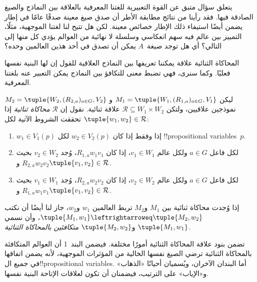 \documentclass[../../../include/open-logic-section]{subfiles}
\begin{document}


يتعلق سؤال متبق عن القوة التعبيرية للغتنا المعرفية بالعلاقة بين
النماذج والصيغ الصادقة فيها. فقد رأينا من نتائج مطابقة الأطر أن صدق
صيغ معينة صدقًا عامًا في إطار يضمن أيضًا استيفاء ذلك الإطار خصائص
معينة. لكن هل تتيح لنا لغتنا الموجهية، مثلًا، التمييز بين عالم فيه سهم
انعكاسي وسلسلة لا نهائية من العوالم يؤدي كل منها إلى التالي؟ أي هل
توجد صيغة~$A$ يمكن أن تصدق في أحد هذين العالمين وحده؟

المحاكاة الثنائية علاقة يمكننا تعريفها بين النماذج العلاقية للقول إن
لها البنية نفسها فعليًا. وكما سنرى، فهي تضبط معنى للتكافؤ بين النماذج
يمكن التعبير عنه بلغتنا المعرفية.

\begin{defn}
ليكن $M_1 = \tuple{W_1,(R_{1,a})_{a \in G},V_1}$ و
$M_2 = \tuple{W_2,(R_{2,a})_{a \in G},V_2}$ نموذجين علاقيين، ولتكن
$\mathcal{R} \subseteq W_1 \times W_2$ علاقة ثنائية. نقول إن
$\mathcal{R}$ \emph{محاكاة ثنائية} إذا تحققت الشروط الآتية لكل
$\tuple{w_1, w_2} \in \mathcal{R}$:

\begin{enumerate}
  \item $w_1 \in V_1(p)$ إذا وفقط إذا كان $w_2 \in V_2(p)$ لكل
  !!{propositional variable}s~$p$.
  \item لكل فاعل $a \in G$ ولكل عالم $v_1 \in W_1$، إذا كان
  $R_{1,a} w_1 v_1$، وُجد $v_2 \in W_2$ بحيث
  $R_{2,a} w_2 v_2$ و$\tuple{v_1, v_2} \in
  \mathcal{R}$.
  \item لكل فاعل $a \in G$ ولكل عالم $v_2 \in W_2$، إذا كان
   $R_{2,a} w_2 v_2$، وُجد $v_1 \in W_1$ بحيث
   $R_{1,a} w_1 v_1$ و$\tuple{v_1, v_2} \in
   \mathcal{R}$.
\end{enumerate}

إذا وُجدت محاكاة ثنائية بين $M_1$ و$M_2$ تربط العالمين $w_1$
و$w_2$، جاز لنا أيضًا أن نكتب
$\tuple{M_1, w_1} \leftrightarroweq \tuple{M_2, w_2}$، وأن نسمي
$\tuple{M_1, w_1}$ و$\tuple{M_2, w_2}$ \emph{متكافئين بالمحاكاة
الثنائية}.
\end{defn}

تضمن بنود علاقة المحاكاة الثنائية أمورًا مختلفة. فيضمن البند~1 أن
العوالم المتكافئة بالمحاكاة الثنائية ترضي الصيغ نفسها الخالية من
المؤثرات الموجهية، لأنه يضمن اتفاقها في جميع
ال!!{propositional variable}s. أما البندان الآخران، ويُسميان أحيانًا
«الذهاب» و«الإياب» على الترتيب، فيضمنان أن تكون لعلاقات الإتاحة البنية
نفسها.
\end{document}
